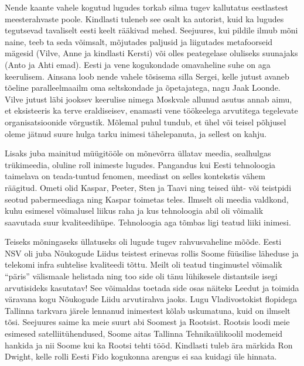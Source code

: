 Nende kaante vahele kogutud lugudes torkab silma tugev kallutatus 
eestlastest meesterahvaste poole. Kindlasti tuleneb see osalt ka autorist, kuid 
ka lugudes tegutsevad tavaliselt eesti keelt rääkivad mehed. Seejuures, kui pildile ilmub mõni 
naine, teeb ta seda võimsalt, mõjutades paljusid ja 
liigutades metafoorseid mägesid (Vilve, 
Anne ja kindlasti Kersti) või olles peategelase oluliseks suunajaks (Anto ja Ahti emad). Eesti 
ja vene kogukondade omavaheline suhe on aga keerulisem. Ainsana loob nende 
vahele tõsisema silla Sergei, kelle jutust avaneb 
tõeline paralleelmaailm oma seltskondade ja õpetajatega, nagu Jaak Loonde. 
Vilve jutust läbi jooksev keerulise nimega Moskvale allunud asutus annab aimu, 
et eksisteeris ka terve eraldiseisev, enamasti vene töökeelega arvutitega 
tegelevate organisatsioonide võrgustik. Mõlemal puhul tundub, et ühel või 
teisel põhjusel oleme jätnud suure hulga tarku inimesi tähelepanuta, ja sellest 
on kahju.

Lisaks juba mainitud müügitööle on mõnevõrra üllatav meedia, sealhulgas 
trükimeedia, oluline roll inimeste lugudes. Pangandus kui Eesti tehnoloogia 
taimelava on teada-tuntud fenomen, meediast on selles kontekstis vähem 
räägitud. Ometi olid Kaspar, Peeter, Sten ja Taavi ning teised üht- või teistpidi 
seotud pabermeediaga ning Kaspar toimetas teles. Ilmselt oli meedia valdkond, 
kuhu esimesel võimalusel liikus raha ja kus tehnoloogia abil oli võimalik 
saavutada suur kvaliteedihüpe. Tehnoloogia aga tõmbas ligi teatud liiki 
inimesi.

Teiseks mõningaseks üllatuseks oli lugude tugev rahvusvaheline mõõde. Eesti NSV 
oli juba Nõukogude Liidus teistest erinevas rollis Soome füüsilise läheduse 
ja telekomi infra suhtelise kvaliteedi tõttu. Meilt oli teatud tingimustel 
võimalik \enquote{päris} välismaale helistada ning too side oli tänu lühikesele 
distantsile isegi arvutisideks kasutatav! See võimaldas toetada side osas 
näiteks Leedut ja toimida väravana kogu Nõukogude Liidu arvutirahva 
jaoks. Lugu Vladivostokist flopidega Tallinna tarkvara järele lennanud 
inimestest kõlab uskumatuna, kuid on ilmselt tõsi. Seejuures saime ka 
meie suurt abi Soomest ja Rootsist. Rootsis loodi meie esimesed 
satelliitühendused, Soome aitas Tallinna Tehnikaülikoolil modemeid hankida ja nii 
Soome kui ka Rootsi tehti tööd. Kindlasti tuleb ära märkida Ron 
Dwight, kelle rolli Eesti Fido kogukonna arengus ei saa 
kuidagi üle hinnata. 

